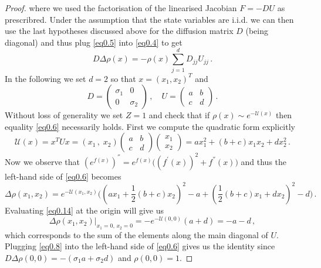 \documentclass[../main.tex]{subfiles}
\begin{document}
\begin{proof}
          where we used the factorisation of the linearised Jacobian $F=-DU$ as prescribred.
     Under the assumption that the state variables are i.i.d. we can then use the last hypotheses discussed above for the diffusion matrix $D$ (being diagonal) and thus plug \eqref{eq0.5} into \eqref{eq0.4} to get
     \begin{equation}\label{eq0.13}
          D\Delta \rho(x) = -\rho(x)\sum_{j=1}^{d}D_{jj}U_{jj}\,.
     \end{equation}
     In the following we set $d=2$ so that $x=(x_{1},x_{2})^{T}$ and 
     \begin{equation*}
          D = \begin{pmatrix}
                  \sigma_{1} & 0 \\
                  0 & \sigma_{2}
          \end{pmatrix}\,,\quad U = \begin{pmatrix}
                  a & b \\
                  c & d
          \end{pmatrix}\,.
     \end{equation*}
     Without loss of generality we set $Z = 1$ and check that if $\rho(x)\sim e^{-\mathcal{U}(x)}$ then equality \eqref{eq0.6} necessarily holds. 
     First we compute the quadratic form explicitly
     \begin{equation*}
          \mathcal{U}(x)=x^{T}Ux=(x_{1}\,,\;x_{2})\begin{pmatrix}
                  a & b \\
                  c & d
          \end{pmatrix}\begin{pmatrix}
               x_{1} \\
               x_{2}
          \end{pmatrix} = ax_{1}^{2}+(b+c)x_{1}x_{2}+dx_{2}^{2}\,.
     \end{equation*}
     Now we observe that $(e^{f(x)})^{''}=e^{f(x)}\Big((f^{'}(x))^{2}+f^{''}(x)\Big)$ and thus the left-hand side of \eqref{eq0.6} becomes
     \begin{equation}\label{eq0.14}
          \Delta \rho(x_{1}, x_{2}) = e^{-\mathcal{U}(x_{1},x_{2})}\bigg((a x_{1}+ \frac{1}{2}(b+c)x_{2})^{2}-a+(\frac{1}{2}(b+c)x_{1}+d x_{2})^{2}-d\bigg)\,.
     \end{equation}
     Evaluating \eqref{eq0.14} at the origin will give us
     \begin{equation}\label{eq0.15}
          \left.\Delta\rho(x_{1}, x_{2})\right|_{x_{1}=0,\,x_{2}=0}=-e^{- \mathcal{U}(0,0)}(a+d)=-a - d\,,
     \end{equation}
     which corresponds to the sum of the elements along the main diagonal of $U$. Plugging \eqref{eq0.8} into the left-hand side of \eqref{eq0.6} gives us the identity since $D\Delta\rho(0,0)= -(\sigma_{1}a+\sigma_{2}d)$ and $\rho(0,0)=1$. 
     \end{proof}
\end{document}
